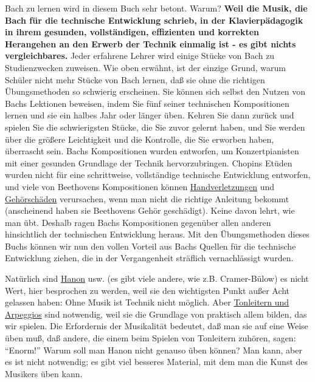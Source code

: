 Bach zu lernen wird in diesem Buch sehr betont.
Warum?
\textbf{Weil die Musik, die Bach für die technische Entwicklung schrieb, in der Klavierpädagogik in ihrem gesunden, vollständigen, effizienten und korrekten Herangehen an den Erwerb der Technik einmalig ist - es gibt nichts vergleichbares.}
Jeder erfahrene Lehrer wird einige Stücke von Bach zu Studienzwecken zuweisen.
Wie oben erwähnt, ist der einzige Grund, warum Schüler nicht mehr Stücke von Bach lernen, daß sie ohne die richtigen Übungsmethoden so schwierig erscheinen.
Sie können sich selbst den Nutzen von Bachs Lektionen beweisen, indem Sie fünf seiner technischen Kompositionen lernen und sie ein halbes Jahr oder länger üben.
Kehren Sie dann zurück und spielen Sie die schwierigsten Stücke, die Sie zuvor gelernt haben, und Sie werden über die größere Leichtigkeit und die Kontrolle, die Sie erworben haben, überrascht sein.
Bachs Kompositionen wurden entworfen, um Konzertpianisten mit einer gesunden Grundlage der Technik hervorzubringen.
Chopins Etüden wurden nicht für eine schrittweise, vollständige technische Entwicklung entworfen, und viele von Beethovens Kompositionen können \hyperref[c1iii10hand]{Handverletzungen} und \hyperref[c1iii10gehoer]{Gehörschäden} verursachen, wenn man nicht die richtige Anleitung bekommt (anscheinend haben sie Beethovens Gehör geschädigt).
Keine davon lehrt, wie man übt.
Deshalb ragen Bachs Kompositionen gegenüber allen anderen hinsichtlich der technischen Entwicklung heraus.
Mit den Übungsmethoden dieses Buchs können wir nun den vollen Vorteil aus Bachs Quellen für die technische Entwicklung ziehen, die in der Vergangenheit sträflich vernachlässigt wurden.

Natürlich sind \hyperref[c1iii7h]{Hanon} usw. (es gibt viele andere, wie z.B. Cramer-Bülow) es nicht Wert, hier besprochen zu werden, weil sie den wichtigsten Punkt außer Acht gelassen haben: Ohne Musik ist Technik nicht möglich.
Aber \hyperref[c1iii7d]{Tonleitern und Arpeggios} sind notwendig, weil sie die Grundlage von praktisch allem bilden, das wir spielen.
Die Erfordernis der Musikalität bedeutet, daß man sie auf eine Weise üben muß, daß andere, die einem beim Spielen von Tonleitern zuhören, sagen: \enquote{Enorm!}
Warum soll man Hanon nicht genauso üben können?
Man kann, aber es ist nicht notwendig; es gibt viel besseres Material, mit dem man die Kunst des Musikers üben kann.

